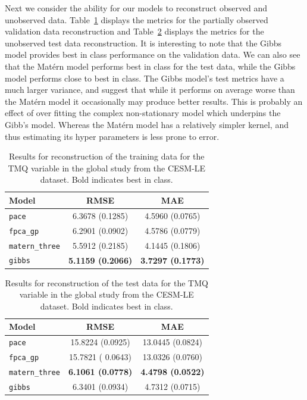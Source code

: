 Next we consider the ability for our models to reconstruct observed and unobserved data. 
Table~\ref{tab:train_cesm_tmq_globe} displays the metrics for the partially observed validation data reconstruction and Table~\ref{tab:test_cesm_tmq_globe} displays the metrics for the unobserved test data reconstruction.
It is interesting to note that the Gibbs model provides best in class performance on the  validation data.
We can also see that the Mat\'ern model performs best in class for the test data, while the Gibbs model performs close to best in class.
The Gibbs model's test metrics have a much larger variance, and suggest that while it performs on average worse than the Mat\'ern model it occasionally may produce better results.
This is probably an effect of over fitting the complex non-stationary model which underpins the Gibb's model.
Whereas the Mat\'ern model has a relatively simpler kernel, and thus estimating its hyper parameters is less prone to error.

\begin{table}
	\caption[Results for the TMQ variable on training data in the Global study.]{Results for reconstruction of the training data for the TMQ variable in the global study from the CESM-LE dataset. Bold indicates best in class.}
	\centering
	\label{tab:train_cesm_tmq_globe}
	\begin{tabular}{lcc}
		\toprule
		\textbf{Model} & \textbf{RMSE} & \textbf{MAE} \\
		\midrule
		\verb*|pace| & 6.3678 (0.1285) & 4.5960 (0.0765) \\
		\verb*|fpca_gp| & 6.2901	(0.0902) & 4.5786 (0.0779) \\
		\verb*|matern_three| & 5.5912 (0.2185)& 4.1445 (0.1806)\\
		\verb*|gibbs| & \textbf{5.1159 (0.2066)} & \textbf{3.7297 (0.1773)}\\
		\bottomrule
	\end{tabular}
\end{table}

\begin{table}
	\caption[Results for the TMQ variable on test data in the Global study.]{Results for reconstruction of the test data for the TMQ variable in the global study from the CESM-LE dataset. Bold indicates best in class.}
	\centering
	\label{tab:test_cesm_tmq_globe}
	\begin{tabular}{lcc}
		\toprule
		\textbf{Model} & \textbf{RMSE} & \textbf{MAE} \\
		\midrule
		\verb*|pace| & 15.8224 (0.0925) & 13.0445 (0.0824) \\
		\verb*|fpca_gp| & 15.7821 (	0.0643) & 13.0326 (0.0760) \\
		\verb*|matern_three| & \textbf{6.1061 (0.0778)}& \textbf{4.4798 (0.0522)}\\
		\verb*|gibbs| & 6.3401 (0.0934) & 4.7312 (0.0715)\\
		\bottomrule
	\end{tabular}
\end{table}

